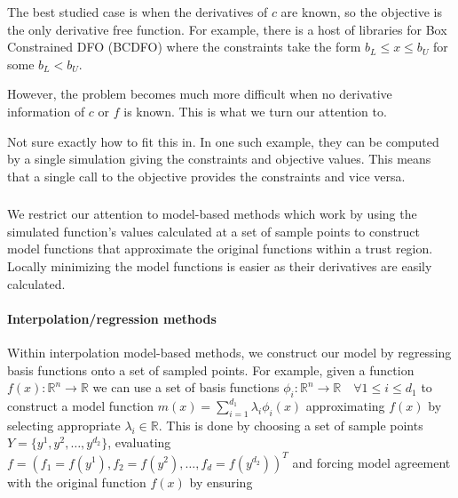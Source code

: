 \documentclass{article}
\begin{document}
The best studied case is when the derivatives of $c$ are known, so the objective is the only derivative free function.
For example, there is a host of libraries for Box Constrained DFO (BCDFO) where the constraints take the form $b_{L} \le x \le b_{U}$ for some $b_{L} < b_{U}$.

However, the problem becomes much more difficult when no derivative information of $c$ or $f$ is known.
This is what we turn our attention to.

Not sure exactly how to fit this in.
\color{red}
In one such example, they can be computed by a single simulation giving the constraints and objective values.
This means that a single call to the objective provides the constraints and vice versa.
\color{black}


\subsubsection{}

We restrict our attention to model-based methods which work by using the simulated function's values calculated at a set of sample points to construct model
functions that approximate the original functions within a trust region.
Locally minimizing the model functions is easier as their derivatives are easily calculated.

\paragraph{Interpolation/regression methods}

Within interpolation model-based methods, we construct our model by regressing basis functions onto a set of sampled points.
For example, given a function $f(x) : \mathbb R^n \to \mathbb R$ we can use a set of basis functions $\phi_i : \mathbb R^n \to \mathbb R \quad \forall 1 \le i \le d_1$ to construct a model function $m(x) = \sum_{i=1}^{d_1} \lambda_i \phi_i(x)$ approximating $f(x)$ by selecting appropriate $\lambda_i \in \mathbb R$.
This is done by choosing a set of sample points
$Y = \{y^1, y^2, \ldots, y^{d_2}\}$,
evaluating $f = (f_1 = f(y^1), f_2 = f(y^2), \ldots, f_d = f(y^{d_2}))^T$
and forcing model agreement with the original function $f(x)$ by ensuring
\end{document}
